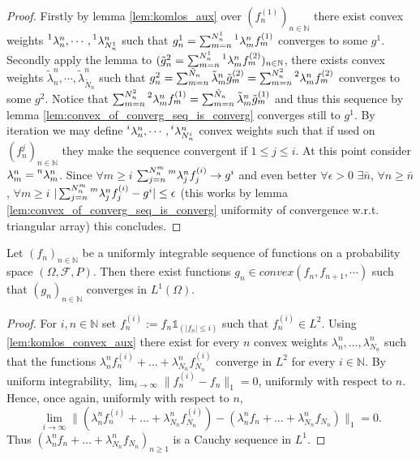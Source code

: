 \begin{proof}
  Firstly by lemma \ref{lem:komlos_aux} over $(f_n^{(1)})_{n\in\mathbb{N}}$ there exist convex weights $\prescript{1}{}{\lambda}^n_n,\cdots,\prescript{1}{}{\lambda}^n_{N^1_n}$ such that
  $g^1_n=\sum_{m=n}^{N^1_n}\prescript{1}{}{\lambda}^n_mf_m^{(1)}$ converges to some $g^1$.
  Secondly apply the lemma to $(\tilde{g}^2_n=\sum_{m=n}^{N^1_n}\prescript{1}{}{\lambda}^n_mf^{(2)}_m)_{n\in\mathbb{N}}$, there exists convex weights $\tilde{\lambda}^n_n,\cdots,\tilde{\lambda}^n_{\tilde{N}_n}$ such that
  $g^2_n=\sum_{m=n}^{\tilde{N}_n}\tilde{\lambda}^n_m\tilde{g}_m^{(2)}=\sum_{m=n}^{N^2_n}\prescript{2}{}{\lambda}^n_mf_m^{(2)}$ converges to some $g^2$.
  Notice that $\sum_{m=n}^{N^2_n}\prescript{2}{}{\lambda}^n_mf_m^{(1)}=\sum_{m=n}^{\tilde{N}_n}\tilde{\lambda}^n_m\tilde{g}_m^{(1)}$ and thus this sequence by lemma \ref{lem:convex_of_converg_seq_is_converg} converges still to $g^1$.
  By iteration we may define $\prescript{i}{}{\lambda}^n_n,\cdots,\prescript{i}{}{\lambda}^n_{N^i_n}$ convex weights such that if used on $(f^j_n)_{n\in\mathbb{N}}$ they make the sequence convergent if $1\leq j\leq i$.
  At this point consider $\lambda^n_m=\prescript{n}{}{\lambda}^n_m$.
  Since $\forall m\geq i$ $\sum_{j=n}^{N^m_n}\prescript{m}{}{\lambda}^n_j f^{(i)}_j\rightarrow g^i$ and even better
  $\forall\epsilon>0$ $\exists\bar{n}$, $\forall n\geq\bar{n}$, $\forall m\geq i$ $|\sum_{j=n}^{N^m_n}\prescript{m}{}{\lambda}^n_j f^{(i)}_j - g^i|\leq\epsilon$
  (this works by lemma \ref{lem:convex_of_converg_seq_is_converg} uniformity of convergence w.r.t. triangular array) this concludes.
\end{proof}


\begin{lemma}\label{lem:komlos}
  Let $( f_n)_{n\in\mathbb{N}}$ be a uniformly integrable sequence of functions on a probability space $(\Omega , \mathcal{F} , P)$.
  Then there exist functions $g_n \in convex( f_n, f_{n+1}, \cdots)$ such that $(g_n)_{n\in\mathbb{N}}$ converges in  $L^1 (\Omega )$.
\end{lemma}

\begin{proof}
  For $i,n\in\mathbb{N}$ set $f_{n}^{(i)}:=f_n \mathbb{1}_{(|f_n|\leq i)}$ such that $f_{n}^{(i)}\in L^2$.
  Using \ref{lem:komlos_convex_aux} there exist for every $n$ convex weights $\lambda_n^{n}, \ldots, \lambda_{N_n}^{n}$ such that the functions
  $ \lambda_n^{n} f_n^{(i)} + \ldots+\lambda_{N_n}^{n} f_{N_n}^{(i)}$ converge in $L^2$ for every $i\in\mathbb{N}$.
  By uniform integrability, $\lim_{i\to \infty}\| f^{(i)}_n- f_n\|_1=0$, uniformly with respect to $n$.
  Hence, once again, uniformly with respect to $n$,
  $$ \textstyle\lim_{i\to\infty}\|  (\lambda_n^{n} f_n^{(i)} + \ldots+\lambda_{N_n}^{n} f_{N_n}^{(i)})-(\lambda_n^{n} f_n + \ldots+\lambda_{N_n}^{n} f_{N_n})\|_1= 0.$$
  Thus $(\lambda_n^{n} f_n + \ldots+\lambda_{N_n}^{n} f_{N_n})_{n\geq 1}$  is a Cauchy sequence in $L^1$.
\end{proof}



